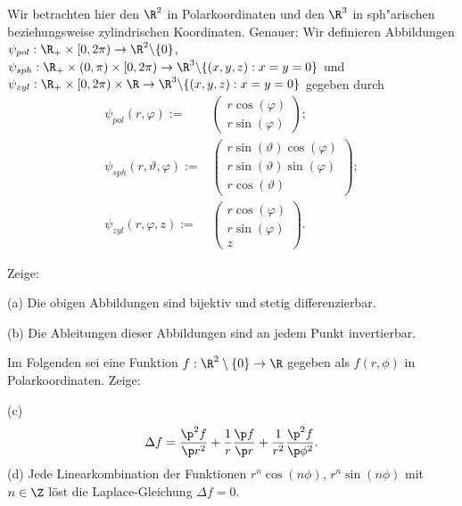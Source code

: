 \begin{prob}
Wir betrachten hier den $\R^2$ in Polarkoordinaten und den $\R^3$ in sph"arischen beziehungsweise zylindrischen Koordinaten. Genauer: Wir definieren Abbildungen $\psi_{pol}:\R_+\times[0,2\pi)\to\R^2\backslash\{0\}$, $\psi_{sph}:\R_+\times(0,\pi)\times[0,2\pi)\to \R^3\backslash\{(x,y,z):x=y=0\}$ und $\psi_{zyl}:\R_+\times[0,2\pi)\times\R\to\R^3\backslash\{(x,y,z):x=y=0\}$ gegeben durch
\begin{equation*}
\begin{split}
\psi_{pol}(r,\varphi):=&
\begin{pmatrix}
r\cos(\varphi)\\ 
r\sin(\varphi)
\end{pmatrix};\\
\psi_{sph}(r,\vartheta,\varphi):=
&\begin{pmatrix} 
r\sin(\vartheta)\cos(\varphi)\\
r\sin(\vartheta)\sin(\varphi)\\
r\cos(\vartheta)
\end{pmatrix};\\
\psi_{zyl}(r,\varphi,z):=&
\begin{pmatrix}
r\cos(\varphi)\\
r\sin(\varphi)\\
z
\end{pmatrix}.
\end{split}
\end{equation*}

Zeige:

(a) Die obigen Abbildungen sind bijektiv und stetig differenzierbar.

(b) Die Ableitungen dieser Abbildungen sind an jedem Punkt invertierbar.

Im Folgenden sei eine Funktion $f:\R^2\setminus\{0\}\to\R$ gegeben als $f(r,\phi)$
in Polarkoordinaten. Zeige:

(c)
$$
\Delta f = \frac{\p^2f}{\p r^2}+\frac{1}{r}\frac{\p f}{\p
  r} + \frac{1}{r^2}\frac{\p^2f}{\p\phi^2}.
$$
(d) Jede Linearkombination der Funktionen $r^n\cos(n\phi)$,
$r^n\sin(n\phi)$ mit
$n\in\Z$ l\"ost die Laplace-Gleichung $\Delta f=0$.
\end{prob}
